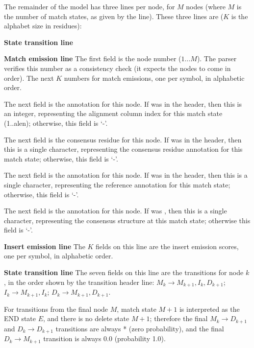 The remainder of the model has three lines per node, for $M$ nodes
(where $M$ is the number of match states, as given by the 
line). These three lines are ($K$ is the alphabet size in residues):

\begin{sreitems}{\textbf{State transition line}}

\item [\textbf{Match emission line}] The first field is the node
number ($1 \ldots M$).  The parser verifies this number as a
consistency check (it expects the nodes to come in order). The next
$K$ numbers for match emissions, one per symbol, in alphabetic order.

The next field is the  annotation for this node.  If
 was  in the header, then this is an integer,
representing the alignment column index for this match state
(1..alen); otherwise, this field is `-'.

The next field is the  consensus residue for this node.  If
 was  in the header, then this is a single
character, representing the consensus residue annotation for this
match state; otherwise, this field is `-'.

The next field is the  annotation for this node.  If
 was  in the header, then this is a single
character, representing the reference annotation for this match state;
otherwise, this field is `-'.

The next field is the  annotation for this node.  If
 was , then this is a single character,
representing the consensus structure at this match state; otherwise
this field is `-'.

\item [\textbf{Insert emission line}] The $K$ fields on this line are
the insert emission scores, one per symbol, in alphabetic order.

\item [\textbf{State transition line}] The seven fields on this line
are the transitions for node $k$, in the order shown by the transition
header line: $M_k \rightarrow M_{k+1}, I_{k}, D_{k+1}$; $ I_k
\rightarrow M_{k+1}, I_k$; $D_{k} \rightarrow M_{k+1}, D_{k+1}$.

For transitions from the final node $M$, match state $M+1$ is
interpreted as the END state $E$, and there is no delete state $M+1$;
therefore the final $M_k \rightarrow D_{k+1}$ and $D_k \rightarrow
D_{k+1}$ transitions are always * (zero probability), and the final
$D_k \rightarrow M_{k+1}$ transition is always 0.0 (probability 1.0).
\end{sreitems}


